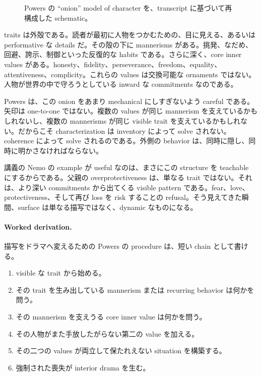 \begin{figure}[h]
\centering
{}
\caption{Powers の ``onion'' model of character を、transcript に基づいて再構成した schematic。}
\end{figure}

traits は外殻である。読者が最初に人物をつかむための、目に見える、あるいは performative な details だ。その殻の下に mannerisms がある。挑発、なだめ、回避、誇示、制御といった反復的な habits である。さらに深く、core inner values がある。honesty、fidelity、perseverance、freedom、equality、attentiveness、complicity。これらの values は交換可能な ornaments ではない。人物が世界の中で守ろうとしている inward な commitments なのである。

Powers は、この onion をあまり mechanical にしすぎないよう careful である。矢印は one-to-one ではない。複数の values が同じ mannerism を支えているかもしれないし、複数の mannerisms が同じ visible trait を支えているかもしれない。だからこそ characterization は inventory によって solve されない。coherence によって solve されるのである。外側の behavior は、同時に隠し、同時に明かさなければならない。

講義の Nemo の example が useful なのは、まさにこの structure を teachable にするからである。父親の overprotectiveness は、単なる trait ではない。それは、より深い commitments から出てくる visible pattern である。fear、love、protectiveness、そして再び loss を risk することの refusal。そう見えてきた瞬間、surface は単なる描写ではなく、dynamic なものになる。

\paragraph{Worked derivation.} 描写をドラマへ変えるための Powers の procedure は、短い chain として書ける。
\begin{enumerate}
\item visible な trait から始める。
\item その trait を生み出している mannerism または recurring behavior は何かを問う。
\item その mannerism を支えうる core inner value は何かを問う。
\item その人物がまた手放したがらない第二の value を加える。
\item その二つの values が両立して保たれえない situation を構築する。
\item 強制された喪失が interior drama を生む。
\end{enumerate}

